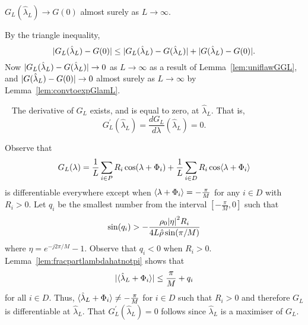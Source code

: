 \documentclass[journal]{IEEEtran}
\begin{document}
\begin{lemma}\label{lem:GLtoG0}
$G_L(\hat{\lambda}_L) \rightarrow G(0)$ almost surely as $L \rightarrow \infty$.
\end{lemma}
\begin{IEEEproof}
By the triangle inequality,
\[
{\vert G_L(\hat{\lambda}_L) - G(0) \vert} \leq {\vert G_L(\hat{\lambda}_L) - G(\hat{\lambda}_L) \vert} + {\vert G(\hat{\lambda}_L) - G(0) \vert}.
\]
Now ${\vert G_L(\hat{\lambda}_L) - G(\hat{\lambda}_L) \vert} \rightarrow 0$ as $L \rightarrow \infty$ as a result of Lemma~\ref{lem:uniflawGGL}, and ${\vert G(\hat{\lambda}_L) - G(0) \vert} \rightarrow 0$ almost surely as $L \rightarrow \infty$ by Lemma~\ref{lem:convtoexpGlamL}.
\end{IEEEproof}


\begin{lemma}~\label{lem:diffatlambdaL}
The derivative of $G_L$ exists, and is equal to zero, at $\hat{\lambda}_L$.  That is,
\[
G_L^\prime(\hat{\lambda}_L) = \frac{d G_L}{d \lambda}(\hat{\lambda}_L) = 0.
\]
\end{lemma}
\begin{IEEEproof}
Observe that 
\[
G_L(\lambda) = \frac{1}{L}\sum_{i \in P} R_i \cos(\lambda + \Phi_i) + \frac{1}{L} \sum_{i \in D} R_i \cos\langle \lambda + \Phi_i \rangle
\] 
is differentiable everywhere except when $\left\langle \lambda + \Phi_i \right\rangle = -\tfrac{\pi}{M}$ for any $i \in D$ with $R_i > 0$.  Let $q_i$ be the smallest number from the interval $[-\tfrac{\pi}{M}, 0]$ such that
\[
 \sin(q_i) > -\frac{\rho_0 {\vert \eta \vert}^2 R_i}{4 L \hat{\rho} \sin(\pi/M)}
\]
where $\eta = e^{-j2\pi/M} - 1$.  Observe that $q_i < 0$ when $R_i > 0$.  Lemma~\ref{lem:fracpartlambdahatnotpi} shows that
\[
{\vert \langle \hat{\lambda}_L + \Phi_i \rangle \vert} \leq \frac{\pi}{M} + q_i
\]
for all $i \in D$.  Thus, $\langle \hat{\lambda}_L + \Phi_i \rangle \neq -\tfrac{\pi}{M}$ for $i \in D$ such that $R_i > 0$ and therefore $G_L$ is differentiable at $\hat{\lambda}_L$.  That $G_L^\prime(\hat{\lambda}_L) = 0$ follows since $\hat{\lambda}_L$ is a maximiser of $G_L$.
\end{IEEEproof}
\end{document}
